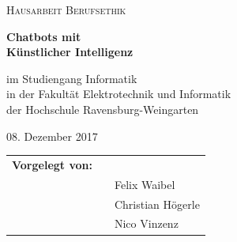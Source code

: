 \begin{figure}[ht]
	\hfill
\end{figure}

\begin{center}
	\textsc{\Large{Hausarbeit Berufsethik\\[1.5cm]}}
\end{center}

\begin{center}
	\LARGE{\textbf{	
			Chatbots mit \\
			Künstlicher Intelligenz \\[2.0cm]
	}}
\end{center}

\begin{center}
	\small{im Studiengang Informatik}\\
	\small{in der Fakultät Elektrotechnik und Informatik}\\
	\small{der Hochschule Ravensburg-Weingarten}\\[2.0cm]
\end{center}

\begin{center}
	\large{08. Dezember 2017\\[2.0cm]}
\end{center}

\begin{center}
	\begin{tabular}{lll}
		\textbf{Vorgelegt von:}\\
		 & & Felix Waibel\\
		&& Christian Högerle\\
		&& Nico Vinzenz
	\end{tabular}
\end{center}
